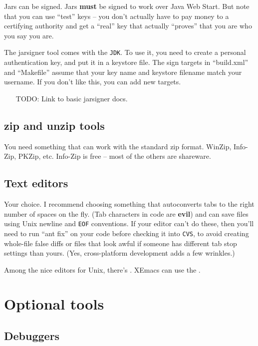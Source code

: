 \documentclass{article}
\begin{document}
Jars can be signed. Jars \textbf{must} be signed to work over Java Web Start.
But note that you can use ``test'' keys -- you don't actually have to
pay money to a certifying authority and get a ``real'' key that actually
``proves'' that you are who you say you are.

The jarsigner tool comes with the \texttt{JDK}. To use it, you need to create
a personal authentication key, and put it in a keystore file. The sign
targets in ``build.xml'' and ``Makefile'' assume that your key name and
keystore filename match your username. If you don't like this, you can
add new targets.

\begin{itemize}
\item[TODO:] Link to basic jarsigner docs.
\end{itemize}

\subsection{zip and unzip tools}

You need something that can work with the standard zip format. WinZip, 
Info-Zip, PKZip, etc. Info-Zip is free -- most of the others are
shareware. 

\subsection{Text editors}

Your choice. I recommend choosing something that autoconverts tabs to
the right number of spaces on the fly. (Tab characters in code are
\textbf{evil}) and can save files using Unix newline and \texttt{EOF}
conventions. If your editor can't do these, then you'll need to run
``ant fix'' on your code before checking it into \texttt{CVS}, to avoid
creating whole-file false diffs or files that look awful if someone has
different tab stop settings than yours. (Yes, cross-platform development
adds a few wrinkles.)

Among the nice editors for Unix, there's . XEmacs can use the
.

\section{Optional tools}

\subsection{Debuggers}
\end{document}
